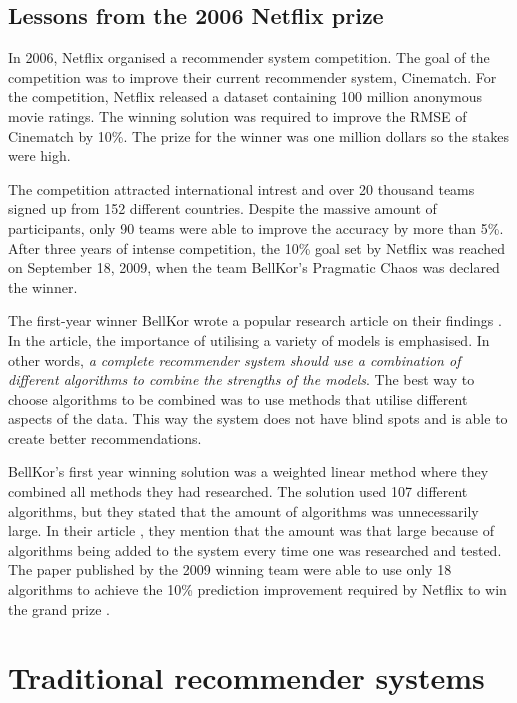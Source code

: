 \documentclass[english, 12pt, a4paper, sci, utf8, a-2b, online]{aaltothesis}
\begin{document}
\subsection{Lessons from the 2006 Netflix prize}

In 2006, Netflix organised a recommender system competition. The goal of the competition was to improve their current recommender system, Cinematch. For the competition, Netflix released a dataset containing 100 million anonymous movie ratings. The winning solution was required to improve the RMSE of Cinematch by 10\%. The prize for the winner was one million dollars so the stakes were high.

The competition attracted international intrest and over 20 thousand teams signed up from 152 different countries. Despite the massive amount of participants, only 90 teams were able to improve the accuracy by more than 5\%. After three years of intense competition, the 10\% goal set by Netflix was reached on September 18, 2009, when the team BellKor's Pragmatic Chaos was declared the winner.

The first-year winner BellKor wrote a popular research article on their findings \parencite{bell2007lessons}. In the article, the importance of utilising a variety of models is emphasised. In other words, \textit{a complete recommender system should use a combination of different algorithms to combine the strengths of the models}. The best way to choose algorithms to be combined was to use methods that utilise different aspects of the data. This way the system does not have blind spots and is able to create better recommendations.

BellKor's first year winning solution was a weighted linear method where they combined all methods they had researched. The solution used 107 different algorithms, but they stated that the amount of algorithms was unnecessarily large. In their article \parencite{bell2007lessons}, they mention that the amount was that large because of algorithms being added to the system every time one was researched and tested. The paper published by the 2009 winning team were able to use only 18 algorithms to achieve the 10\% prediction improvement required by Netflix to win the grand prize \parencite{toscher2009bigchaos}. 


\newpage

\section{Traditional recommender systems}
\label{sec:traditional_RS}
\end{document}
